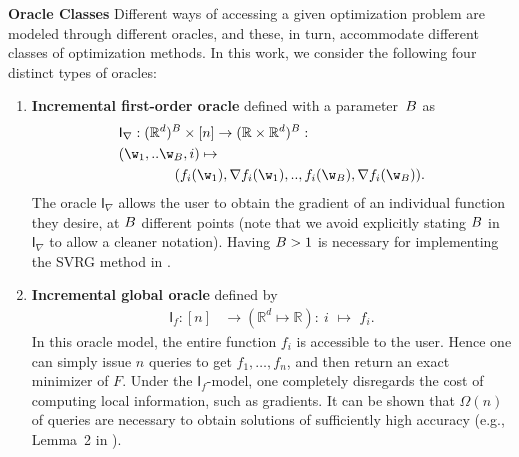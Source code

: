 \documentclass{article}
\theoremstyle{definition}  \newtheorem{exercise}{Exercise}
\theoremstyle{plain}
\newcommand{\pref}[1]{\prettyref{#1}}
\newcommand{\RR}{\mathbb{R}}
\DeclarePairedDelimiter{\prn}{(}{)}
\theoremstyle{definition}
\theoremstyle{remark}
\begin{document}
	\textbf{Oracle Classes\quad} Different ways of accessing a given 
	optimization problem are modeled through different oracles, 
	and these, in turn, accommodate 
	different classes of optimization methods. In this work, 
we consider the following four distinct types of oracles:
	\newcommand{\orcifn}{\mathsf{I}_{\nabla}}
	\newcommand{\orcif}{\orcifn(\w,i)}
	\newcommand{\orcign}{\mathsf{I}_{f}}
	\newcommand{\orcig}{\orcign(i)}
	\newcommand{\orcsfn}{\mathsf{S}_{\nabla}}
	\newcommand{\orcsf}{\orcsfn(\w)}
	\newcommand{\orcsg}{\mathsf{S}_{f}}
	\newcommand{\oracle}{\mathsf{O}}
	\begin{enumerate}[leftmargin=0.3cm]
		\item \textbf{Incremental first-order oracle} defined with a parameter~$B$ as		\label{item:inc_orc}
		\begin{align}
			&\orcifn:(\RR^d)^\query \times [n] \to(\RR\times 
			\RR^d)^\query:\\
			& (\w_1,..\w_\query,i)\mapsto \nonumber \\
		&\qquad\qquad\prn*{	f_i(\w_1),\nabla f_i(\w_1),..,f_i(\w_\query),\nabla 
			f_i(\w_\query)}.\nonumber 
		\end{align}
		The oracle $\orcifn$ allows the user to obtain the gradient of an 
		individual function they desire, at $B$ different points (note that 
		we avoid explicitly stating $B$ in $\orcifn$ to allow a cleaner 
		notation).  Having $B>1$ is	necessary for implementing the SVRG method 
		in \pref{sec:app}. 


		\item \textbf{Incremental global oracle} defined by
		\begin{align}
			\orcign:[n] &\to (\RR^d \mapsto \RR): 
			~ i \,\,   \mapsto   \,\, f_i.
		\end{align}
		In this oracle model, the entire function $f_i$ is accessible to the 
		user. Hence one can
simply issue $n$ queries to get $f_1,\dots,f_n$, and then return
		an exact minimizer of $F$. Under the $\orcign$-model, one completely 
		disregards the cost of computing local information, such as 
		gradients. 
		It can be shown that $\Omega(n)$ of queries are necessary to obtain 
		solutions of sufficiently high accuracy (e.g., Lemma~2 in 
		\cite{arjevani2016dimension}). 
	

\end{enumerate}
\end{document}
